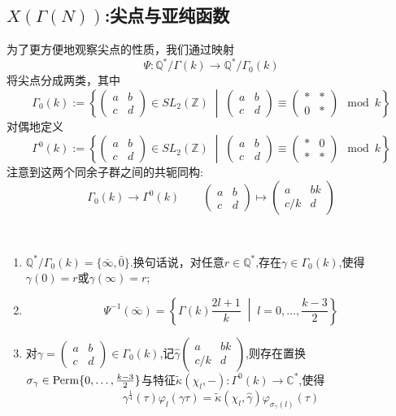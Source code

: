 \subsection{$X(\Gamma(N))$:尖点与亚纯函数}
为了更方便地观察尖点的性质，我们通过映射
$$\Psi: \mathbb{Q}^*/\Gamma(k) \longrightarrow \mathbb{Q}^*/\Gamma_0(k)$$
将尖点分成两类，其中
$$\Gamma_0(k):=\left\{ \begin{pmatrix}
a &b \\ c & d
\end{pmatrix} \in SL_2(\mathbb{Z}) \;\middle|\; \begin{pmatrix}
a &b \\ c & d
\end{pmatrix} \equiv \begin{pmatrix}
* & * \\ 0 & *
\end{pmatrix} \mod k  \right\}$$
对偶地定义
$$\Gamma^0(k):=\left\{ \begin{pmatrix}
a & b \\ c & d
\end{pmatrix} \in SL_2(\mathbb{Z}) \;\middle|\; \begin{pmatrix}
a & b \\ c & d
\end{pmatrix} \equiv \begin{pmatrix}
* & 0 \\ * & *
\end{pmatrix} \mod k  \right\}$$
注意到这两个同余子群之间的共轭同构:
$$\Gamma_0(k) \longrightarrow \Gamma^0(k) \qquad \begin{pmatrix}
a & b \\ c & d
\end{pmatrix} \longmapsto \begin{pmatrix}
a & bk \\ c/k & d
\end{pmatrix}$$
\begin{lemma}\
	\begin{enumerate}[(1)]
		\item $\mathbb{Q}^*/\Gamma_0(k)=\{\bar{\infty}, \bar{0} \}$.换句话说，对任意$r \in \mathbb{Q}^*$,存在$\gamma \in \Gamma_0(k)$,使得$\gamma (0)=r$或$\gamma (\infty)=r$;
		\item $$\Psi^{-1}(\bar{\infty})= \left\{ \Gamma(k) \frac{2l+1}{k} \;\middle|\; l=0,\ldots,\frac{k-3}{2} \right\}$$
		\item 对$\gamma=\left(\begin{smallmatrix}
		a & b \\ c & d
		\end{smallmatrix}\right) \in \Gamma_0(k)$,记$\hat{\gamma}\left(\begin{smallmatrix}
		a & bk \\ c/k & d
		\end{smallmatrix}\right)$,则存在置换$\sigma_{\gamma} \in \operatorname{\operatorname{Perm}} \{0,\ldots,\frac{k-3}{2} \}$与特征$\tilde{\kappa}(\chi_l,-):\Gamma^0(k) \longrightarrow \mathbb{C}^*$,使得
		$$\gamma^{\frac{1}{4}}(\tau)\varphi_l(\gamma\tau)=\tilde{\kappa}(\chi_l,\hat{\gamma})\varphi_{\sigma_{\gamma}(l)}(\tau) $$
	\end{enumerate}
	
\end{lemma}

